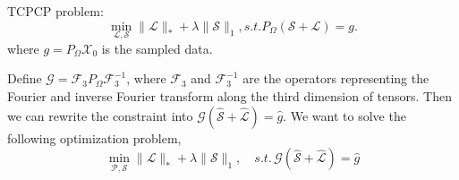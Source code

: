 \documentclass[a4paper,12pt]{article}
\theoremstyle{mystyle}
\begin{document}
\begin{CJK*}{GBK}{song}
\CJKindent          %
\CJKtilde           %


\pagestyle{MyPgsStylex}   %

\setlength\baselineskip{24pt}   %
\setlength{\parskip}{2pt}       %

\setlength{\abovedisplayskip}{2pt plus 2pt minus 4pt}
\setlength{\belowdisplayskip}{2pt plus 2pt minus 4pt}







\thispagestyle{empty}   %


\bigskip
\noindent TCPCP problem:
\begin{equation}\label{e1}
\min_{\mathcal{L},\mathcal{S}}\|\mathcal{L}\|_*+\lambda \|\mathcal{S}\|_1, s.t. P_{\Omega}(\mathcal{S+L})=g.
\end{equation}
where $g=P_{\Omega}\mathcal{X}_0$ is the sampled data. 

Define $\mathcal{G}=\mathcal{F}_3P_{\Omega}\mathcal{F}_3^{-1}$, where $\mathcal{F}_3$ and $\mathcal{F}_3^{-1}$ are the operators representing the Fourier and inverse Fourier transform along the third dimension of tensors. Then we can rewrite the constraint into $\mathcal{G}\mathcal{(\hat{S}+\hat{L})}={\hat{g}}$. We want to solve the following optimization problem,
\begin{equation}\label{e2}
\min_{\mathcal{P},\mathcal{S}}\|\mathcal{L}\|_*+\lambda\|\mathcal{S}\|_1,
\quad s.t.\, \mathcal{G}\mathcal{(\hat{S}+\hat{L})}={\hat{g}}
\end{equation}


\end{CJK*}
\end{document}
